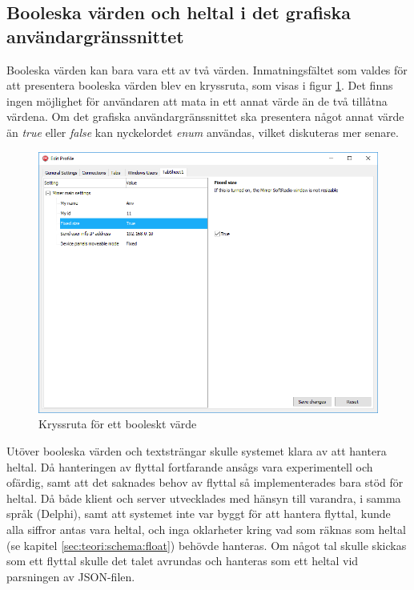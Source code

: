 \FloatBarrier
\subsection{Booleska värden och heltal i det grafiska användargränssnittet}

Booleska värden kan bara vara ett av två värden. Inmatningsfältet som valdes för att presentera booleska värden blev en kryssruta, som visas i figur \ref{fig:bool}. Det finns ingen möjlighet för användaren att mata in ett annat värde än de två tillåtna värdena. Om det grafiska användargränssnittet ska presentera något annat värde än \textit{true} eller \textit{false} kan nyckelordet \textit{enum} användas, vilket diskuteras mer senare.

\begin{figure}
	\includegraphics[width=\textwidth]{./images/gui/bool.png}
	\vspace{-1.7em}
	\caption{Kryssruta för ett booleskt värde}
	\label{fig:bool}
\end{figure}

Utöver booleska värden och textsträngar skulle systemet klara av att hantera heltal. Då hanteringen av flyttal fortfarande ansågs vara experimentell och ofärdig, samt att det saknades behov av flyttal så implementerades bara stöd för heltal. Då både klient och server utvecklades med hänsyn till varandra, i samma språk (Delphi), samt att systemet inte var byggt för att hantera flyttal, kunde alla siffror antas vara heltal, och inga oklarheter kring vad som räknas som heltal (se kapitel \ref{sec:teori:schema:float}) behövde hanteras. Om något tal skulle skickas som ett flyttal skulle det talet avrundas och hanteras som ett heltal vid parsningen av JSON-filen.

